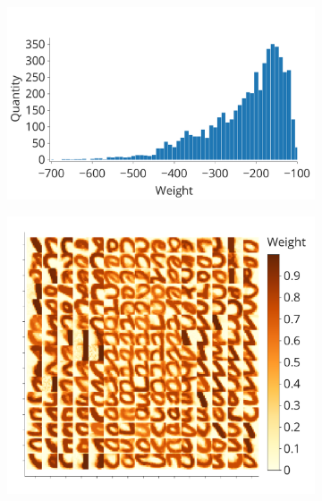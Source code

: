 \documentclass[a4paper,10pt]{article}
\begin{document}
\begin{figure}
\centering 
\begin{subfigure}{0.45\textwidth}
    \includegraphics[width=\textwidth,keepaspectratio=true]{competition_distribution_clamp_low.pdf}
    \caption{}
    \label{fig:compe_clamp:low_distr}
\end{subfigure}
\begin{subfigure}{0.45\textwidth}
    \includegraphics[width=\textwidth,keepaspectratio=true]{weights_XY_clamp_low.pdf}
    \caption{}
    \label{fig:compe_clamp:low_weights}
\end{subfigure} 
\begin{subfigure}{0.45\textwidth}

\end{subfigure}
\end{figure}
\end{document}

